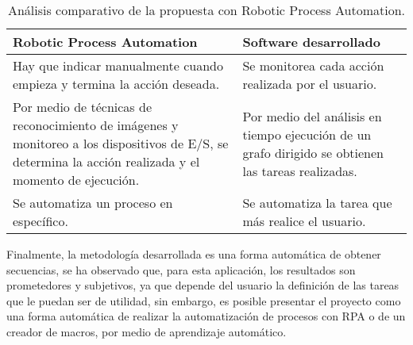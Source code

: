 \begin{table}[h]
\centering
\caption{An\'alisis comparativo de la propuesta con Robotic Process
 Automation.}
\begin{tabular}{m{6cm}|m{6cm}}
\hline
\textbf{Robotic Process Automation}    &    \textbf{Software desarrollado} \\

\hline
Hay que indicar manualmente cuando empieza y termina la acci\'on deseada.
&
Se monitorea cada acci\'on realizada por el usuario.\\

\hline
Por medio de t\'ecnicas de reconocimiento de im\'agenes y monitoreo a los dispositivos de E/S, se determina la acci\'on realizada y el momento de ejecuci\'on. 
&
Por medio del an\'alisis en tiempo ejecuci\'on de un grafo dirigido se obtienen las tareas realizadas.\\

\hline
Se automatiza un proceso en espec\'ifico.
&
Se automatiza la tarea que m\'as realice el usuario.\\

\hline
\end{tabular}

\label{vsrpa}
\end{table}


Finalmente, la metodolog\'ia desarrollada es una forma autom\'atica de obtener 
 secuencias, se ha observado que, para esta aplicaci\'on, los resultados son 
 prometedores y subjetivos, ya que depende del usuario la definici\'on de las 
 tareas que le puedan ser de utilidad, sin embargo, es posible presentar el 
 proyecto como una forma autom\'atica de realizar la automatizaci\'on de 
 procesos con RPA o de un creador de macros, por medio de aprendizaje 
 autom\'atico.
